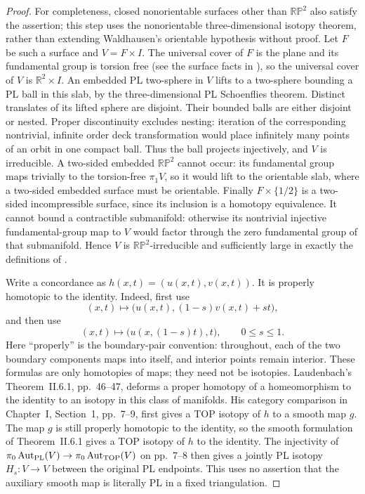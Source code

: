 \begin{proof}
For completeness, closed nonorientable surfaces other than
$\mathbb{RP}^2$ also satisfy the assertion; this step uses the
nonorientable three-dimensional isotopy theorem, rather than
extending Waldhausen's orientable hypothesis without proof.
Let $F$ be such a surface and $V=F\times I$.
The universal cover of $F$ is the plane and its fundamental
group is torsion free (see the surface facts in
\cite[Corollary~1.8, pp.~85--86, and Lemma~4.3, p.~92]{Epstein1966}),
so the universal cover of $V$ is
$\mathbb R^2\times I$. An embedded PL two-sphere in $V$
lifts to a two-sphere bounding a PL ball in this slab, by the
three-dimensional PL Schoenflies theorem. Distinct translates
of its lifted sphere are disjoint. Their bounded balls are
either disjoint or nested. Proper discontinuity excludes
nesting: iteration of the corresponding nontrivial, infinite
order deck transformation would place infinitely many points
of an orbit in one compact ball. Thus the ball projects
injectively, and $V$ is irreducible. A two-sided embedded
$\mathbb{RP}^2$ cannot occur: its fundamental group maps
trivially to the torsion-free $\pi_1V$, so it would lift to
the orientable slab, where a two-sided embedded surface must
be orientable. Finally $F\times\{1/2\}$ is a two-sided
incompressible surface, since its inclusion is a homotopy
equivalence. It cannot bound a contractible submanifold:
otherwise its nontrivial injective fundamental-group map to
$V$ would factor through the zero fundamental group of that
submanifold. Hence $V$ is $\mathbb{RP}^2$-irreducible and
sufficiently large in exactly the definitions of
\cite[Chapter~II, Section~1, pp.~15--17]{Laudenbach1974}.

Write a concordance as $h(x,t)=(u(x,t),v(x,t))$.
It is properly homotopic to the identity. Indeed, first use
\[
 (x,t)\longmapsto
 \bigl(u(x,t),(1-s)v(x,t)+st\bigr),
\]
and then use
\[
 (x,t)\longmapsto\bigl(u(x,(1-s)t),t\bigr),\qquad 0\leq s\leq1.
\]
Here ``properly'' is the boundary-pair convention: throughout,
each of the two boundary components maps into itself, and
interior points remain interior. These formulas are only
homotopies of maps; they need not be isotopies.
Laudenbach's Theorem~II.6.1, pp.~46--47, deforms a proper
homotopy of a homeomorphism to the identity to an isotopy in
this class of manifolds. His category comparison in Chapter~I, Section~1,
pp.~7--9, first gives a TOP isotopy of $h$ to a smooth map $g$.
The map $g$ is still properly homotopic to the identity, so the
smooth formulation of Theorem~II.6.1 gives a TOP isotopy of
$h$ to the identity. The injectivity of
$\pi_0\operatorname{Aut}_{\rm PL}(V)\to
 \pi_0\operatorname{Aut}_{\rm TOP}(V)$ on pp.~7--8 then gives
a jointly PL isotopy $H_s:V\to V$ between the original PL
endpoints. This uses no assertion that the auxiliary smooth
map is literally PL in a fixed triangulation.


\end{proof}
